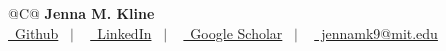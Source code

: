 \documentclass[letterpaper,10pt]{article}
\begin{document}
\thispagestyle{firstpage}%




\begin{tabularx}{\linewidth}{@{}C@{}}
\Large\textbf{{Jenna M. Kline}} \\[7.5pt]
\href{https://jennamk14.github.io/}{\raisebox{-0.05\height}\faGithub\ Github} \ $|$ \ 
%
\href{https://www.linkedin.com/in/jenna-kline-00937ab2/}{\raisebox{-0.05\height}\faLinkedin\ LinkedIn} \ $|$
%
\ 
%
\href{https://scholar.google.com/citations?user=bhNDuigAAAAJ}{\raisebox{-0.05\height}\faGraduationCap \ Google Scholar} \ $|$ \
%
\href{mailto:jennamk9@mit.edu}{\raisebox{-0.05\height}\faEnvelope \ jennamk9@mit.edu} \
%
%
%

\end{tabularx}

\vspace{10pt}   %
\end{document}
